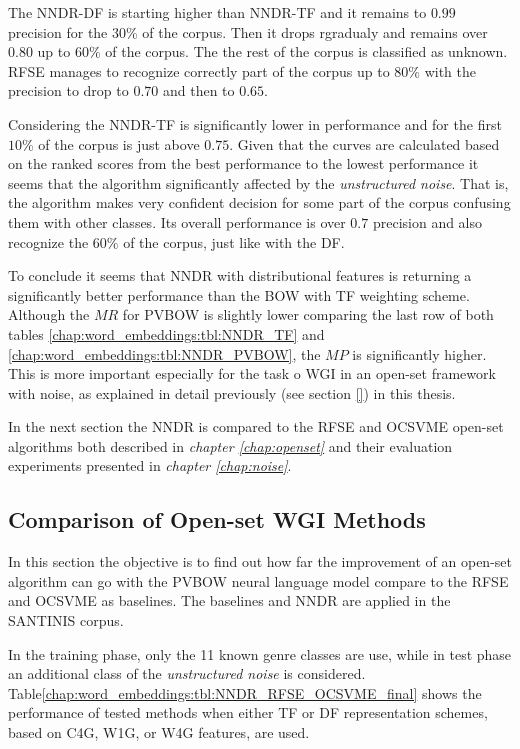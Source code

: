 The NNDR-DF is starting higher than NNDR-TF and it remains to $0.99$ precision for the $30\%$ of the corpus. Then it drops rgradualy and remains over $0.80$ up to $60\%$ of the corpus. The the rest of the corpus is classified as unknown. RFSE manages to recognize correctly part of the corpus up to $80\%$ with the precision to drop to $0.70$ and then to $0.65$. 

Considering the NNDR-TF is significantly lower in performance and for the first $10\%$ of the corpus is just above $0.75$. Given that the curves are calculated based on the ranked scores from the best performance to the lowest performance it seems that the algorithm significantly affected by the \textit{unstructured noise}. That is, the algorithm makes very confident decision for some part of the corpus confusing them with other classes. Its overall performance is over $0.7$ precision and also recognize the $60\%$ of the corpus, just like with the DF.

To conclude it seems that NNDR with distributional features is returning a significantly better performance than the BOW with TF weighting scheme. Although the $ΜR$ for PVBOW is slightly lower comparing the last row of both tables \ref{chap:word_embeddings:tbl:NNDR_TF} and \ref{chap:word_embeddings:tbl:NNDR_PVBOW}, the $MP$ is significantly higher. This is more important especially for the task o WGI in an open-set framework with noise, as explained in detail previously (see section \ref{}) in this thesis. 

In the next section the NNDR is compared to the RFSE and OCSVME open-set algorithms both described in \textit{chapter \ref{chap:openset}} and their evaluation experiments presented in \textit{chapter \ref{chap:noise}}.


\subsection{Comparison of Open-set WGI Methods}\label{chap:word_embeddings:sec:experiments_setup}

In this section the objective is to find out  how far the improvement of an open-set algorithm can go with the PVBOW neural language model compare to the RFSE and OCSVME as baselines. The baselines and NNDR are applied in the SANTINIS corpus. 

In the training phase, only the 11 known genre classes are use, while in test phase an additional class of the \textit{unstructured noise} is considered. Table\ref{chap:word_embeddings:tbl:NNDR_RFSE_OCSVME_final} shows the performance of tested methods when either TF or DF representation schemes, based on C4G, W1G, or W4G features, are used. 

